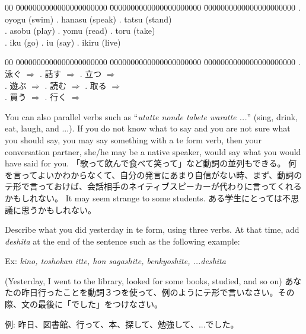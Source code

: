 \documentclass[uplatex,dvipdfmx,b5paper,english,10pt]{jsbook}
\begin{document}
\ifEnglish
\begin{tabbing}
 00 \=
 0000000000000000000000 \=
 0000000000000000000000 \=
 0000000000000000000000 \kill
 . oyogu (swim)    . hanasu (speak)  . tatsu (stand)   \\
 . asobu (play)    . yomu (read)     . toru (take)     \\
 . iku (go)        . iu (say)        . ikiru (live)    \\
\end{tabbing}
\else
\begin{tabbing}
 00 \=
 0000000000000000000000 \=
 0000000000000000000000 \=
 0000000000000000000000 \kill
 . 泳ぐ $\Rightarrow$   . 話す $\Rightarrow$   . 立つ $\Rightarrow$   \\
 . 遊ぶ $\Rightarrow$   . 読む $\Rightarrow$   . 取る $\Rightarrow$   \\
 . 買う $\Rightarrow$   . 行く $\Rightarrow$   \\
\end{tabbing}
\fi

\ifEnglish
You can also parallel verbs such as ``{\it utatte nonde tabete waratte ...\/}'' (sing, drink, eat, laugh, and ...).
If you do not know what to say and you are not sure what you should say, you may say something with a te form verb, then your conversation partner, she/he may be a native speaker, would say what you would have said for you.
\else
「歌って飲んで食べて笑って」など動詞の並列もできる。
何を言ってよいかわからなくて、自分の発言にあまり自信がない時、まず、動詞のテ形で言っておけば、会話相手のネイティブスピーカーが代わりに言ってくれるかもしれない。
\fi
\ifEnglish
It may seem strange to some students.
\else
ある学生にとっては不思議に思うかもしれない。
\fi

\begin{toiquestion}
 \ifEnglish
 Describe what you did yesterday in te form, using three verbs. At that time, add {\it deshita\/} at the end of the sentence such as the following example:

Ex: {\it kino, toshokan itte, hon sagashite, benkyoshite, ...deshita\/}

(Yesterday, I went to the library, looked for some books, studied, and so on)
 \else
 あなたの昨日行ったことを動詞３つを使って、例のようにテ形で言いなさい。その際、文の最後に「でした」をつけなさい。

 例: 昨日、図書館、行って、本、探して、勉強して、...でした。
 \fi
\end{toiquestion}
\end{document}
